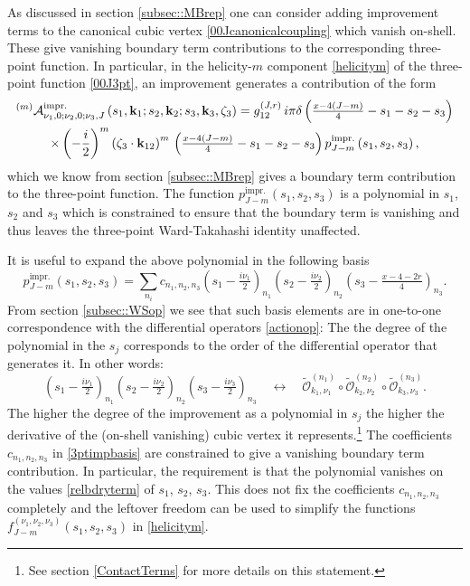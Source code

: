 \documentclass[11pt,a4paper]{article}
\begin{document}
As discussed in section \ref{subsec::MBrep} one can consider adding improvement terms to the canonical cubic vertex \eqref{00Jcanonicalcoupling} which vanish on-shell. These give vanishing boundary term contributions to the corresponding three-point function. In particular, in the helicity-$m$ component \eqref{helicitym} of the three-point function \eqref{00J3pt}, an improvement generates a contribution of the form
\begin{multline}
    {}^{\left(m\right)}{\cal A}^{\text{impr.}}_{\nu_1,0;\nu_2,0;\nu_3,J}\left(s_1,{\bf k}_1;s_2,{\bf k}_2;s_3,{\bf k}_3,\zeta_3\right) = g^{\left(J,r\right)}_{12}\, i\pi \delta\left(\tfrac{x-4\left(J-m\right)}{4}-s_1-s_2-s_3\right) \\ \times \left(-\frac{i}{2}\right)^m \left(\zeta_3 \cdot {\bf k}_{12}\right)^m\,\left(\tfrac{x-4\left(J-m\right)}{4}-s_1-s_2-s_3\right)p^{\text{impr.}}_{J-m}\left(s_1,s_2,s_3\right),
\end{multline}
which we know from section \ref{subsec::MBrep} gives a boundary term contribution to the three-point function. The function $p^{\text{impr.}}_{J-m}\left(s_1,s_2,s_3\right)$ is a polynomial in $s_1$, $s_2$ and $s_3$ which is constrained to ensure that the boundary term is vanishing and thus leaves the three-point Ward-Takahashi identity unaffected.

It is useful to expand the above polynomial in the following basis
\begin{equation}\label{3ptimpbasis}
    p^{\text{impr.}}_{J-m}\left(s_1,s_2,s_3\right) = \sum\limits_{n_i} c_{n_1,n_2,n_3}\left(s_1-\tfrac{i\nu_1}{2}\right)_{n_1}\left(s_2-\tfrac{i\nu_2}{2}\right)_{n_2}\left(s_3-\tfrac{x-4-2r}{4}\right)_{n_3}.
\end{equation}
From section \ref{subsec::WSop} we see that such basis elements are in one-to-one correspondence with the differential operators \eqref{actionop}: The the degree of the polynomial in the $s_j$ corresponds to the order of the differential operator that generates it. In other words:
\begin{equation}\label{polytoop}
    \left(s_1-\tfrac{i\nu_1}{2}\right)_{n_1}\left(s_2-\tfrac{i\nu_2}{2}\right)_{n_2}\left(s_3-\tfrac{i\nu_3}{2}\right)_{n_3} \quad \leftrightarrow \quad \widetilde{\mathcal{O}}_{k_1,\nu_1}^{\left(n_1\right)}\circ\widetilde{\mathcal{O}}_{k_2,\nu_2}^{\left(n_2\right)}\circ\widetilde{\mathcal{O}}_{k_3,\nu_3}^{\left(n_3\right)}.
\end{equation}
The higher the degree of the improvement as a polynomial in $s_j$ the higher the derivative of the (on-shell vanishing) cubic vertex it represents.\footnote{See section \ref{ContactTerms} for more details on this statement.} The coefficients $c_{n_1,n_2,n_3}$ in \eqref{3ptimpbasis} are constrained to give a vanishing boundary term contribution. In particular, the requirement is that the polynomial vanishes on the values \eqref{relbdryterm} of $s_1$, $s_2$, $s_3$. This does not fix the coefficients $c_{n_1,n_2,n_3}$ completely and the leftover freedom can be used to simplify the functions $f^{\left(\nu_1,\nu_2,\nu_3\right)}_{J-m}\left(s_1,s_2,s_3\right)$ in  \eqref{helicitym}.
\end{document}

